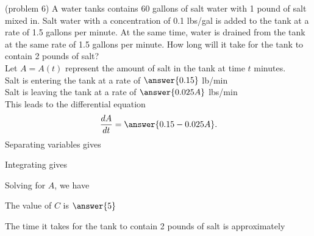 \documentclass{ximera}
\begin{document}
\begin{problem}(problem 6)
A water tanks contains 60 gallons of salt water with 1 pound of salt mixed in. 
Salt water with a concentration of 0.1 lbs/gal is added to the tank at a rate of 1.5 gallons per minute.
At the same time, water is drained from the tank at the same rate of 1.5 gallons per minute.
How long will it take for the tank to contain 2 pounds of salt?\\


Let $A = A(t)$ represent the amount of salt in the tank at time $t$ minutes. \\


Salt is entering the tank at a rate of $\answer{0.15}$ \; lb/min \\
Salt is leaving the tank at a rate of $\answer{0.025A}$ \; lbs/min \\

This leads to the differential equation
\[
\frac{dA}{dt} = \answer{0.15 - 0.025A}.
\]
Separating variables gives

\begin{multipleChoice}
\end{multipleChoice}


Integrating gives
\begin{multipleChoice}
\end{multipleChoice}


Solving for $A$, we have

\begin{multipleChoice}
\end{multipleChoice}

The value of $C$ is $\answer{5}$

The time it takes for the tank to contain 2 pounds of salt  is approximately

\begin{multipleChoice}
\end{multipleChoice}

\end{problem}
\end{document}
